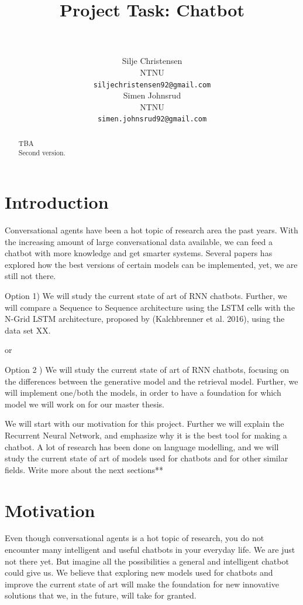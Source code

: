 \documentclass{article} %
\title{Project Task: Chatbot}
\author{
 \\
\texttt{} \\
\AND
Silje Christensen \\
NTNU \\
\texttt{siljechristensen92@gmail.com} \\
\And
Simen Johnsrud \\
NTNU \\
\texttt{simen.johnsrud92@gmail.com} \\
}
\begin{document}
\maketitle

\begin{abstract}
TBA\\
Second version.
\end{abstract}

\section{Introduction}
Conversational agents have been a hot topic of research area the past years. With the increasing amount of large conversational data available, we can feed a chatbot with more knowledge and get smarter systems. Several papers has explored how the best versions of certain models can be implemented, yet, we are still not there.

Option 1) We will study the current state of art of RNN chatbots. Further, we will compare a Sequence to Sequence architecture using the LSTM cells with the N-Grid LSTM architecture, proposed by (Kalchbrenner et al. 2016), using the data set XX. 

or

Option 2 ) We will study the current state of art of RNN chatbots, focusing on the differences between the generative model and the retrieval model. Further, we will implement one/both the models, in order to have a foundation for which model we will work on for our master thesis. 

We will start with our motivation for this project. Further we will explain the Recurrent Neural Network, and emphasize why it is the best tool for making a chatbot. A lot of research has been done on language modelling, and we will study the current state of art of models used for chatbots and for other similar fields. Write more about the next sections** 

\section{Motivation}
Even though conversational agents is a hot topic of research, you do not encounter many intelligent and useful chatbots in your everyday life. We are just not there yet. But imagine all the possibilities a general and intelligent chatbot could give us. We believe that exploring new models used for chatbots and improve the current state of art will make the foundation for new innovative solutions that we, in the future, will take for granted. 
\end{document}
